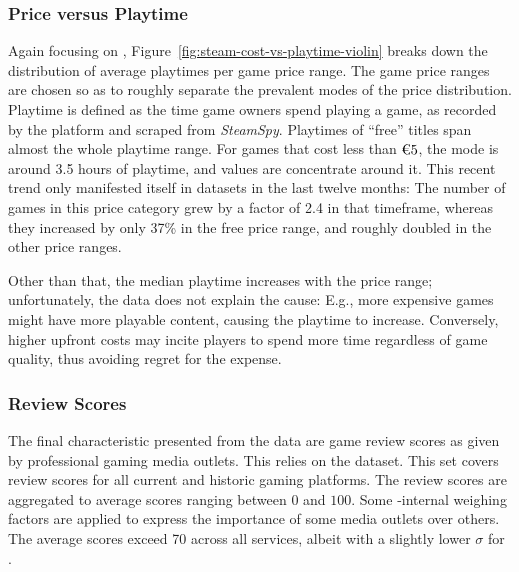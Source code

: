 \subsubsection{Price versus Playtime}
Again focusing on \steam,
Figure~\ref{fig:steam-cost-vs-playtime-violin} breaks down the
distribution of average playtimes per game price range. The game price
ranges are chosen so as to roughly separate the prevalent modes of the
price distribution.
Playtime is defined as the time game owners spend playing a game, as
recorded by the \steam platform and scraped from \textit{SteamSpy}.
Playtimes of ``free'' titles
span almost the whole playtime range.
For games that cost less than $\text{\texteuro} 5$, the mode is around
3.5 hours of playtime, and values are concentrate around it.
This recent trend only
manifested itself in datasets in the last twelve months:
The number of games in this price category grew by a factor of
2.4 in that timeframe,
whereas they
increased by only 37\% in the free price range, and roughly doubled
in the other price ranges.

Other than that, the median playtime increases with the price range;
unfortunately, the data does not explain the cause: E.g., more expensive
games might have more playable content, causing the playtime to
increase. Conversely, higher upfront costs may incite players to spend
more time regardless of game quality, thus avoiding regret for the
expense.


\subsubsection{Review Scores}

The final characteristic presented from the data are game review scores as
given by professional gaming media outlets. This relies on the
\metacritic dataset. This set covers review scores for all current
and historic gaming platforms. The review scores are aggregated to
average scores ranging between $0$ and $100$. Some \metacritic-internal
weighing factors are applied to express the importance of some media
outlets over others.
The average scores exceed 70 across all services, albeit with a
slightly lower $\sigma$ for \gfnow.
